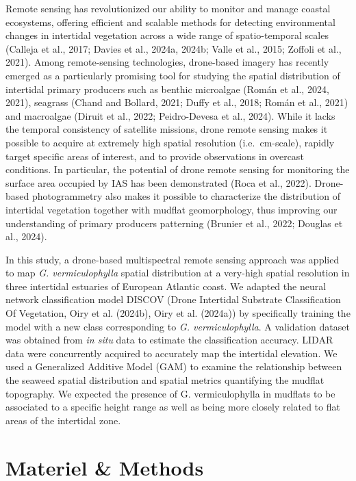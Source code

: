 \documentclass[
  letterpaper,
  DIV=11,
  numbers=noendperiod]{scrartcl}
\begin{document}
Remote sensing has revolutionized our ability to monitor and manage
coastal ecosystems, offering efficient and scalable methods for
detecting environmental changes in intertidal vegetation across a wide
range of spatio-temporal scales (Calleja et al., 2017; Davies et al.,
2024a, 2024b; Valle et al., 2015; Zoffoli et al., 2021). Among
remote-sensing technologies, drone-based imagery has recently emerged as
a particularly promising tool for studying the spatial distribution of
intertidal primary producers such as benthic microalgae (Román et al.,
2024, 2021), seagrass (Chand and Bollard, 2021; Duffy et al., 2018;
Román et al., 2021) and macroalgae (Diruit et al., 2022; Peidro-Devesa
et al., 2024). While it lacks the temporal consistency of satellite
missions, drone remote sensing makes it possible to acquire at extremely
high spatial resolution (i.e.~cm-scale), rapidly target specific areas
of interest, and to provide observations in overcast conditions. In
particular, the potential of drone remote sensing for monitoring the
surface area occupied by IAS has been demonstrated (Roca et al., 2022).
Drone-based photogrammetry also makes it possible to characterize the
distribution of intertidal vegetation together with mudflat
geomorphology, thus improving our understanding of primary producers
patterning (Brunier et al., 2022; Douglas et al., 2024).

In this study, a drone-based multispectral remote sensing approach was
applied to map \emph{G. vermiculophylla} spatial distribution at a
very-high spatial resolution in three intertidal estuaries of European
Atlantic coast. We adapted the neural network classification model
DISCOV (Drone Intertidal Substrate Classification Of Vegetation, Oiry et
al. (2024b), Oiry et al. (2024a)) by specifically training the model
with a new class corresponding to \emph{G. vermiculophylla}. A
validation dataset was obtained from \emph{in situ} data to estimate the
classification accuracy. LIDAR data were concurrently acquired to
accurately map the intertidal elevation. We used a Generalized Additive
Model (GAM) to examine the relationship between the seaweed spatial
distribution and spatial metrics quantifying the mudflat topography. We
expected the presence of G. vermiculophylla in mudflats to be associated
to a specific height range as well as being more closely related to flat
areas of the intertidal zone.

\section{Materiel \& Methods}\label{materiel-methods}
\end{document}
